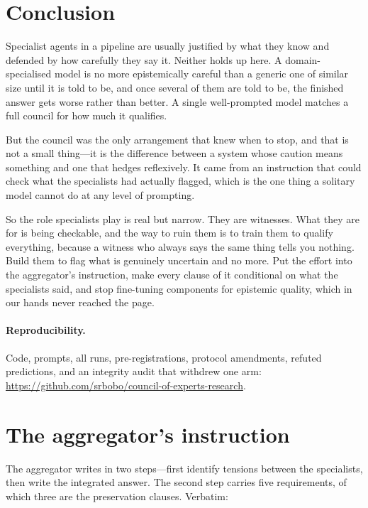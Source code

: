 \documentclass[11pt]{article}
\begin{document}
\section{Conclusion}
Specialist agents in a pipeline are usually justified by what they know and
defended by how carefully they say it. Neither holds up here. A
domain-specialised model is no more epistemically careful than a generic one
of similar size until it is told to be, and once several of them are told to
be, the finished answer gets worse rather than better. A single well-prompted
model matches a full council for how much it qualifies.

But the council was the only arrangement that knew when to stop, and that is
not a small thing---it is the difference between a system whose caution means
something and one that hedges reflexively. It came from an instruction that
could check what the specialists had actually flagged, which is the one thing
a solitary model cannot do at any level of prompting.

So the role specialists play is real but narrow. They are witnesses. What they
are for is being checkable, and the way to ruin them is to train them to
qualify everything, because a witness who always says the same thing tells you
nothing. Build them to flag what is genuinely uncertain and no more. Put the
effort into the aggregator's instruction, make every clause of it conditional
on what the specialists said, and stop fine-tuning components for epistemic
quality, which in our hands never reached the page.

\paragraph{Reproducibility.} Code, prompts, all runs, pre-registrations,
protocol amendments, refuted predictions, and an integrity audit that withdrew
one arm: \url{https://github.com/srbobo/council-of-experts-research}.

\appendix

\section{The aggregator's instruction}
\label{app:prompt}
The aggregator writes in two steps---first identify tensions between the
specialists, then write the integrated answer. The second step carries five
requirements, of which three are the preservation clauses. Verbatim:
\end{document}
